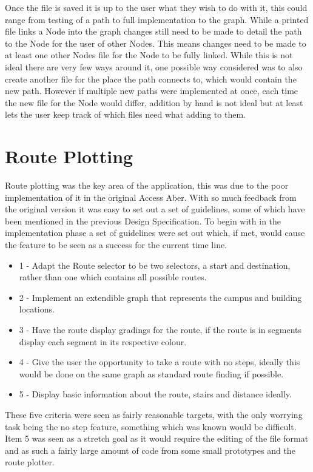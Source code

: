 Once the file is saved it is up to the user what they wish to do with it, this could range from testing of a path to full implementation to the graph. While a printed file links a Node into the graph changes still need to be made to detail the path to the Node for the user of other Nodes. This means changes need to be made to at least one other Nodes file for the Node to be fully linked. While this is not ideal there are very few ways around it, one possible way considered was to also create another file for the place the path connects to, which would contain the new path. However if multiple new paths were implemented at once, each time the new file for the Node would differ, addition by hand is not ideal but at least lets the user keep track of which files need what adding to them. 

\section{Route Plotting}
Route plotting was the key area of the application, this was due to the poor implementation of it in the original Access Aber. With so much feedback from the original version it was easy to set out a set of guidelines, some of which have been mentioned in the previous Design Specification. To begin with in the implementation phase a set of guidelines were set out which, if met, would cause the feature to be seen as a success for the current time line. 

\begin{itemize}
	\item 1 - Adapt the Route selector to be two selectors, a start and destination, rather than one which contains all possible routes.
	\item 2 - Implement an extendible graph that represents the campus and building locations.
	\item 3 - Have the route display gradings for the route, if the route is in segments display each segment in its respective colour.
	\item 4 - Give the user the opportunity to take a route with no steps, ideally this would be done on the same graph as standard route finding if possible.
	\item 5 - Display basic information about the route, stairs and distance ideally.  
\end{itemize}

These five criteria were seen as fairly reasonable targets, with the only worrying task being the no step feature, something which was known would be difficult. Item 5 was seen as a stretch goal as it would require the editing of the file format and as such a fairly large amount of code from some small prototypes and the route plotter.
